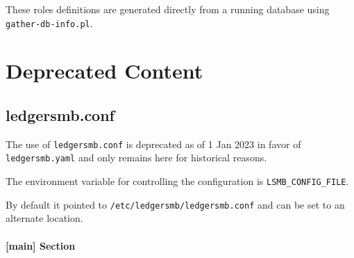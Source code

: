 
\ifpdf
      \newcommand{\htmlspacing}{}
\else
      \newcommand{\htmlspacing}{ \hfill \\}
\fi

These roles definitions are generated directly from a running database using  \texttt{gather-db-info.pl}.



\chapter{Deprecated Content}
\label{app-deprecated-content}

\section{ledgersmb.conf}
\label{app-deprecated-ledgersmb-conf}

The use of \texttt{ledgersmb.conf} \index{ } is deprecated as of 1 Jan 2023 in favor of \texttt{ledgersmb.yaml}  and only remains here for historical reasons.  

The environment variable for controlling the configuration is \texttt{LSMB\_CONFIG\_FILE}.

By default it pointed to \texttt{/etc/ledgersmb/ledgersmb.conf} and can be set to an alternate location.

\subsubsection{[main] Section}
\label{subsubsec-global-config-ledgersmb-conf-general}

